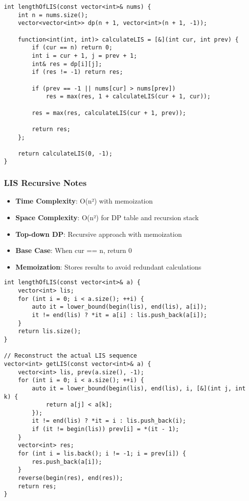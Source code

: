 \documentclass[11pt,a4paper]{article}
\begin{document}
\newpage
\begin{lstlisting}[caption={LIS - Recursive Implementation}]
int lengthOfLIS(const vector<int>& nums) {
    int n = nums.size();
    vector<vector<int>> dp(n + 1, vector<int>(n + 1, -1));

    function<int(int, int)> calculateLIS = [&](int cur, int prev) {
        if (cur == n) return 0;
        int i = cur + 1, j = prev + 1;
        int& res = dp[i][j];
        if (res != -1) return res;

        if (prev == -1 || nums[cur] > nums[prev]) 
            res = max(res, 1 + calculateLIS(cur + 1, cur));

        res = max(res, calculateLIS(cur + 1, prev));

        return res;
    };

    return calculateLIS(0, -1);
}
\end{lstlisting}

\subsubsection*{LIS Recursive Notes}
\begin{itemize}
\item \textbf{Time Complexity}: O(n²) with memoization
\item \textbf{Space Complexity}: O(n²) for DP table and recursion stack
\item \textbf{Top-down DP}: Recursive approach with memoization
\item \textbf{Base Case}: When cur == n, return 0
\item \textbf{Memoization}: Stores results to avoid redundant calculations
\end{itemize}

\newpage
\begin{lstlisting}[caption={LIS - Binary Search Implementation}]
int lengthOfLIS(const vector<int>& a) {
    vector<int> lis;
    for (int i = 0; i < a.size(); ++i) {
        auto it = lower_bound(begin(lis), end(lis), a[i]);
        it != end(lis) ? *it = a[i] : lis.push_back(a[i]);
    }
    return lis.size();
}

// Reconstruct the actual LIS sequence
vector<int> getLIS(const vector<int>& a) {
    vector<int> lis, prev(a.size(), -1);
    for (int i = 0; i < a.size(); ++i) {
        auto it = lower_bound(begin(lis), end(lis), i, [&](int j, int k) { 
            return a[j] < a[k]; 
        });
        it != end(lis) ? *it = i : lis.push_back(i);
        if (it != begin(lis)) prev[i] = *(it - 1);
    }
    vector<int> res;
    for (int i = lis.back(); i != -1; i = prev[i]) {
        res.push_back(a[i]);
    }
    reverse(begin(res), end(res));
    return res;
}
\end{lstlisting}
\end{document}
